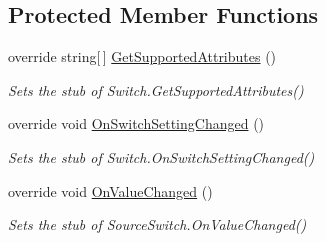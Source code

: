 \subsection*{Protected Member Functions}
\begin{DoxyCompactItemize}
\item 
override string\mbox{[}$\,$\mbox{]} \hyperlink{class_system_1_1_diagnostics_1_1_fakes_1_1_stub_source_switch_a7840213f94a4bc52fb5cfcdbce1389d6}{Get\-Supported\-Attributes} ()
\begin{DoxyCompactList}\small\item\em Sets the stub of Switch.\-Get\-Supported\-Attributes()\end{DoxyCompactList}\item 
override void \hyperlink{class_system_1_1_diagnostics_1_1_fakes_1_1_stub_source_switch_a44a02b918009062e6fa9536e8aed907b}{On\-Switch\-Setting\-Changed} ()
\begin{DoxyCompactList}\small\item\em Sets the stub of Switch.\-On\-Switch\-Setting\-Changed()\end{DoxyCompactList}\item 
override void \hyperlink{class_system_1_1_diagnostics_1_1_fakes_1_1_stub_source_switch_a721a82ad22437c9afa6e8b0cf235281f}{On\-Value\-Changed} ()
\begin{DoxyCompactList}\small\item\em Sets the stub of Source\-Switch.\-On\-Value\-Changed()\end{DoxyCompactList}\end{DoxyCompactItemize}
